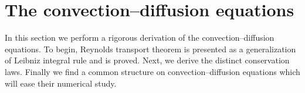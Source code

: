 
\section{The convection--diffusion equations} \label{sec:the_convection_diffusion_equations}

In this section we perform a rigorous derivation of the convection--diffusion equations. To begin, Reynolds transport theorem is presented as a generalization of Leibniz integral rule and is proved. Next, we derive the distinct conservation laws. Finally we find a common structure on convection--diffusion equations which will ease their numerical study.



%
%
%



